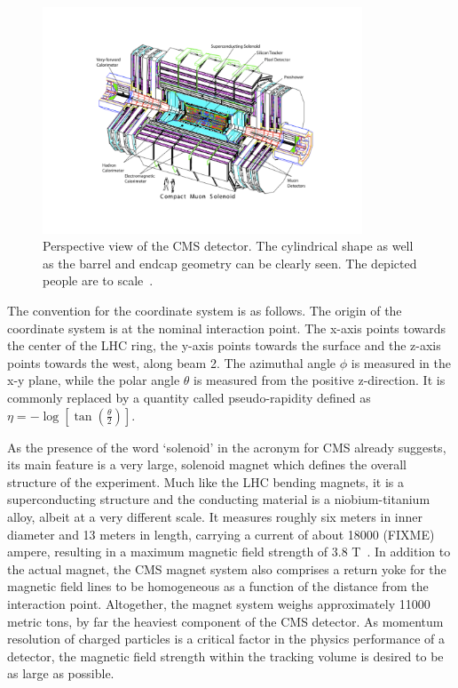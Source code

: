 \begin{figure}[h!]
    \centering
    \includegraphics[width=0.85\textwidth]{../figs/cms_scheme.pdf}
    \caption{Perspective view of the CMS detector. The cylindrical shape as well as the barrel and endcap
geometry can be clearly seen. The depicted people are to scale~\cite{cmsdetector}.}
    \label{fig:cms_scheme}
\end{figure}

The convention for the coordinate system is as follows. The origin of the coordinate system is at the nominal
interaction point. The x-axis points towards the center of the LHC ring, the y-axis points towards the surface
and the z-axis points towards the west, along beam 2. The azimuthal angle $\phi$ is measured in the x-y plane, while the
polar angle $\theta$ is measured from the positive z-direction. It is commonly replaced by a quantity called 
pseudo-rapidity defined as $\eta = - \log \left[ \tan \left(\frac{\theta}{2} \right) \right]$.



As the presence of the word `solenoid' in the acronym for CMS already suggests, its main feature is a very large, solenoid
magnet which defines the overall structure of the experiment. Much like the LHC bending magnets, it is a superconducting
structure and the conducting material is a niobium-titanium alloy, albeit at a very different scale. It measures roughly six
meters in inner diameter and 13 meters in length, carrying a current of about \num{18000} (FIXME) ampere, resulting in a
maximum magnetic field strength of 3.8 T~\cite{magnettdr}. In addition to the actual magnet, the CMS magnet system
also comprises a return yoke for the magnetic field lines to be homogeneous as a function of the distance from the interaction
point. Altogether, the magnet system weighs approximately \num{11000} metric tons, by far the heaviest component of the 
CMS detector. As momentum resolution of charged particles is a critical factor in the physics performance of a detector, the magnetic
field strength within the tracking volume is desired to be as large as possible. 

